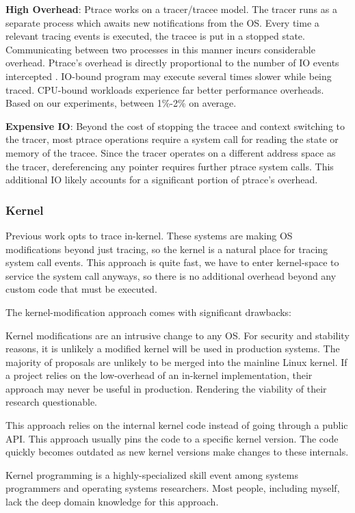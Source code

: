\begin{compactitem}
    \item \textbf{High Overhead}: Ptrace works on a tracer/tracee model. The tracer runs as a separate process which awaits new notifications from the OS. Every time a relevant tracing events is executed, the tracee is put in a stopped state. Communicating between two processes in this manner incurs considerable overhead. Ptrace's overhead is directly proportional to the number of IO events intercepted \cite{dettrace}. IO-bound program may execute several times slower while being traced. CPU-bound workloads experience far better performance overheads. Based on our experiments, between 1\%-2\% on average.
    \item \textbf{Expensive IO}: Beyond the cost of stopping the tracee and context switching to the tracer, most ptrace operations require a system call for reading the state or memory of the tracee. Since the tracer operates on a different address space as the tracer, dereferencing any pointer requires further ptrace system calls. This additional IO likely accounts for a significant portion of ptrace's overhead.
    
\end{compactitem}

\subsubsection{Kernel}
Previous work \cite{arnold, racepro} opts to trace in-kernel. These systems are making OS modifications beyond just tracing, so the kernel is a natural place for tracing system call events. This approach is quite fast, we have to enter kernel-space to service the system call anyways, so there is no additional overhead beyond any custom code that must be executed.

The kernel-modification approach comes with significant drawbacks:

\begin{compactitem}
    \item Kernel modifications are an intrusive change to any OS. For security and stability reasons, it is unlikely a modified kernel will be used in production systems. The majority of proposals are unlikely to be merged into the mainline Linux kernel. If a project relies on the low-overhead of an in-kernel implementation, their approach may never be useful in production. Rendering the viability of their research questionable.
    \item This approach relies on the internal kernel code instead of going through a public API. This approach usually pins the code to a specific kernel version. The code quickly becomes outdated as new kernel versions make changes to these internals.
    \item Kernel programming is a highly-specialized skill event among systems programmers and operating systems researchers. Most people, including myself, lack the deep domain knowledge for this approach.
\end{compactitem}

